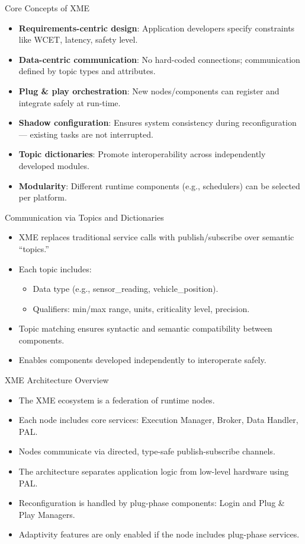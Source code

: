 \documentclass{beamer}
\begin{document}
\begin{frame}{Core Concepts of XME}
  \begin{itemize}
    \item \textbf{Requirements-centric design}: Application developers specify constraints like WCET, latency, safety level.
    \item \textbf{Data-centric communication}: No hard-coded connections; communication defined by topic types and attributes.
    \item \textbf{Plug \& play orchestration}: New nodes/components can register and integrate safely at run-time.
    \item \textbf{Shadow configuration}: Ensures system consistency during reconfiguration — existing tasks are not interrupted.
    \item \textbf{Topic dictionaries}: Promote interoperability across independently developed modules.
    \item \textbf{Modularity}: Different runtime components (e.g., schedulers) can be selected per platform.
  \end{itemize}
\end{frame}

\begin{frame}{Communication via Topics and Dictionaries}
  \begin{itemize}
    \item XME replaces traditional service calls with publish/subscribe over semantic “topics.”
    \item Each topic includes:
    \begin{itemize}
      \item Data type (e.g., sensor\_reading, vehicle\_position).
      \item Qualifiers: min/max range, units, criticality level, precision.
    \end{itemize}
    \item Topic matching ensures syntactic and semantic compatibility between components.
    \item Enables components developed independently to interoperate safely.
  \end{itemize}
\end{frame}

\begin{frame}{XME Architecture Overview}
  \begin{itemize}
    \item The XME ecosystem is a federation of runtime nodes.
    \item Each node includes core services: Execution Manager, Broker, Data Handler, PAL.
    \item Nodes communicate via directed, type-safe publish-subscribe channels.
    \item The architecture separates application logic from low-level hardware using PAL.
    \item Reconfiguration is handled by plug-phase components: Login and Plug \& Play Managers.
    \item Adaptivity features are only enabled if the node includes plug-phase services.
  \end{itemize}
\end{frame}
\end{document}
